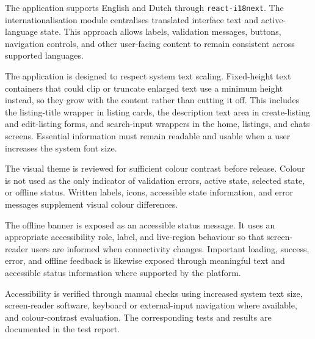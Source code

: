 The application supports English and Dutch through \texttt{react-i18next}.
The internationalisation module centralises translated interface text and active-language state.
This approach allows labels, validation messages, buttons, navigation controls, and other user-facing content to remain consistent across supported languages.

The application is designed to respect system text scaling.
Fixed-height text containers that could clip or truncate enlarged text use a minimum height instead, so they grow with the content rather than cutting it off.
This includes the listing-title wrapper in listing cards, the description text area in create-listing and edit-listing forms, and search-input wrappers in the home, listings, and chats screens.
Essential information must remain readable and usable when a user increases the system font size.

The visual theme is reviewed for sufficient colour contrast before release.
Colour is not used as the only indicator of validation errors, active state, selected state, or offline status.
Written labels, icons, accessible state information, and error messages supplement visual colour differences.

The offline banner is exposed as an accessible status message.
It uses an appropriate accessibility role, label, and live-region behaviour so that screen-reader users are informed when connectivity changes.
Important loading, success, error, and offline feedback is likewise exposed through meaningful text and accessible status information where supported by the platform.

Accessibility is verified through manual checks using increased system text size, screen-reader software, keyboard or external-input navigation where available, and colour-contrast evaluation.
The corresponding tests and results are documented in the test report.
